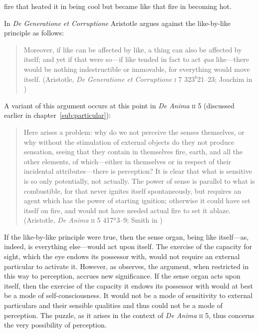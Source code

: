 fire that heated it in being cool but became like that fire in becoming hot. 

In \emph{De Generatione et Corruptione} Aristotle argues against the like-by-like principle as follows:
\begin{quote}
	Moreover, if like can be affected by like, a thing can also be affected by itself; and yet if that were so---if like tended in fact to act \emph{qua} like---there would be nothing indestructible or immovable, for everything would move itself. (Aristotle, \emph{De Generatione et Corruptione} \textsc{i} 7 323\( ^{b} \)21--23; Joachim in \citealt[23]{Barnes:1984uq})
\end{quote}
A variant of this argument occurs at this point in \emph{De Anima} \textsc{ii} 5 (discussed earlier in chapter~\ref{sub:particular}):
\begin{quote}
	Here arises a problem: why do we not perceive the senses themselves, or why without the stimulation of external objects do they not produce sensation, seeing that they contain in themselves fire, earth, and all the other elements, of which---either in themselves or in respect of their incidental attributes---there is perception? It is clear that what is sensitive is so only potentially, not actually. The power of sense is parallel to what is combustible, for that never ignites itself spontaneously, but requires an agent which has the power of starting ignition; otherwise it could have set itself on fire, and would not have needed actual fire to set it ablaze. (Aristotle, \emph{De Anima} \textsc{ii} 5 417\( ^{a} \)3--9; Smith in \citealt[29]{Barnes:1984uq})
\end{quote}
If the like-by-like principle were true, then the sense organ, being like itself---as, indeed, is everything else---would act upon itself. The exercise of the capacity for sight, which the eye endows its possessor with, would not require an external particular to activate it. However, as \citet[226--227]{Polansky:2007ly} observes, the argument, when restricted in this way to perception, accrues new significance. If the sense organ acts upon itself, then the exercise of the capacity it endows its possessor with would at best be a mode of self-consciousness. It would not be a mode of sensitivity to external particulars and their sensible qualities and thus could not be a mode of perception. The puzzle, as it arises in the context of \emph{De Anima} \textsc{ii} 5, thus concerns the very possibility of perception.

